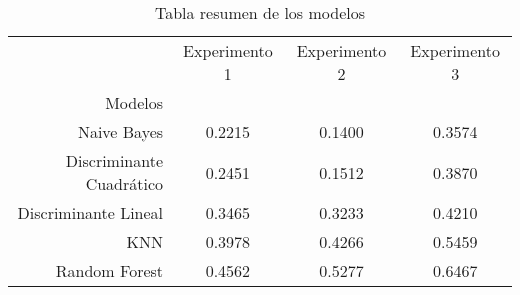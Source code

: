 \begin{table}
\centering
\caption{Tabla resumen de los modelos}
\label{tab:resumen-exp}
\begin{tabular}{rccc}
\toprule
{} &  Experimento 1 &  Experimento 2 &  Experimento 3 \\
Modelos                  &                &                &                \\
\midrule
Naive Bayes              &         0.2215 &         0.1400 &         0.3574 \\
Discriminante Cuadrático &         0.2451 &         0.1512 &         0.3870 \\
Discriminante Lineal     &         0.3465 &         0.3233 &         0.4210 \\
KNN                      &         0.3978 &         0.4266 &         0.5459 \\
Random Forest            &         0.4562 &         0.5277 &         0.6467 \\
\bottomrule
\end{tabular}
\end{table}

